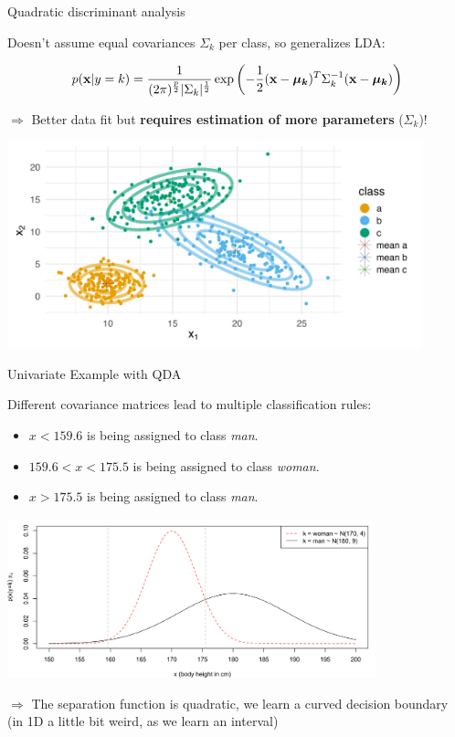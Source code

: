 \documentclass[11pt,compress,t,notes=noshow, xcolor=table]{beamer}
\begin{document}
\begin{vbframe}{Quadratic discriminant analysis}

Doesn't assume equal covariances $\Sigma_k$ per class, so generalizes LDA:

$$
p(\mathbf{x} | y= k) = \frac{1}{(2\pi)^{\frac{p}{2}}|\Sigma_k|^{\frac{1}{2}}} \exp\left(-\frac{1}{2}(\mathbf{x} - \bm{\mu_{k}})^T \Sigma_k^{-1} (\mathbf{x} - \bm{\mu_{k}})\right)
$$

$\Rightarrow$ Better data fit but \textbf{requires estimation of more parameters} ($\Sigma_k$)!

\vspace{-0.5em}
\begin{center}
\includegraphics[width=0.9\textwidth, clip=true, trim={0 75 0 45}]{figure/disc_analysis-qda_2.png}
\end{center}

\end{vbframe}

\begin{vbframe}{Univariate Example with QDA}
\begin{small}
Different covariance matrices lead to multiple classification rules:
\begin{itemize}
  \item $x < 159.6$ is being assigned to class \textit{man}.
  \item $159.6 < x < 175.5$ is being assigned to class \textit{woman}.
  \item $x > 175.5$ is being assigned to class \textit{man}.
\end{itemize}
\begin{center}
\includegraphics[width=0.8\textwidth, clip=true, trim={0 0 0 0}]{figure/disc_univariate-4.png}
\end{center}
$\Rightarrow$ The separation function is quadratic, we learn a curved decision boundary\\
(in 1D a little bit weird, as we learn an interval)
\end{small}
\end{vbframe}
\end{document}
